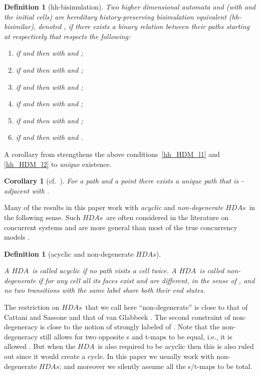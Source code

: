 \documentclass[submission,copyright,creativecommons]{eptcs}
\newtheorem{corollary}[theorem]{Corollary}
\newtheorem{definition}[theorem]{Definition}
\newcommand\HDA{\ensuremath{\mathit{HDA}}}
\newcommand\HDAs{\ensuremath{\mathit{HDAs}}}
\begin{document}
\begin{definition}[hh-bisimulation]\label{def_hhbisim}
Two higher dimensional automata  and  (with  and  the initial cells) are \emph{hereditary history-preserving bisimulation equivalent} (hh-bisimilar), denoted , if there exists a binary relation  between their paths starting at  respectively  that respects the following:
\begin{enumerate}
\item if  and  then  with  and ;
\item if  and  then  with  and ;
\item\label{hh_HDM_l1} if  and  then  with  and ;
\item\label{hh_HDM_l2} if  and  then  with  and ;
\item if  and  then  with  and ;
\item if  and  then  with  and .
\end{enumerate}
\end{definition}

A corollary from \cite{Glabbeek06HDA} strengthens the above conditions~\ref{hh_HDM_l1} and \ref{hh_HDM_l2} to \textit{unique} existence.

\begin{corollary}[cf.~{\cite[sec.7.5]{Glabbeek06HDA}}]\label{cor_unique_adjacent}
For a path  and a point  there exists a unique path  that is -adjacent with .
\end{corollary}





Many of the results in this paper work with \emph{acyclic} and \emph{non-degenerate} \HDAs\ in the following sense. Such \HDAs\ are often considered in the literature on concurrent systems and are more general than most of the true concurrency models \cite{Pratt03trans_cancel,Glabbeek06HDA}.

\begin{definition}[acyclic and non-degenerate \HDAs]\label{def_acyclic}\ 

A \HDA\ is called \emph{acyclic} if no path visits a cell twice. 
A \HDA\ is called \emph{non-degenerate} if for any cell  all its faces exist and are different, in the sense of , and no two transitions with the same label share both their end states.
\end{definition}

The restriction on \HDAs\ that we call here ``non-degenerate'' is close to that of Cattani and Sassone \cite[Def.2.2]{CattaniSassone96HDTS} and that of van Glabbeek \cite[p.10]{Glabbeek06HDA}. The second constraint of non-degeneracy is close to the notion of strongly labeled of \cite[Def.1.13]{Goubault12Category_Cubical}.
Note that the non-degeneracy still allows for two opposite s and t-maps to be equal, i.e., it is allowed . But when the \HDA\ is also required to be acyclic then this is also ruled out since it would create a cycle.
In this paper we usually work with non-degenerate \HDAs; and moreover we silently assume all the s/t-maps to be total.
\end{document}
